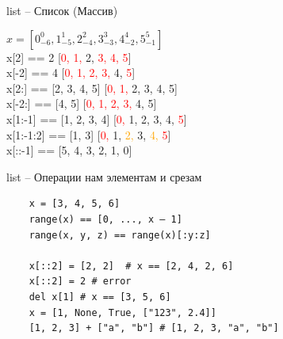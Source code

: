 \documentclass{article}
\begin{document}
\begin{center} list – Список (Массив) \end{center}
{
\Huge
\begin{flushleft}
$x = [0_{-6}^{0}, 1_{-5}^{1}, 2_{-4}^{2}, 3_{-3}^{3}, 4_{-2}^{4}, 5_{-1}^{5}]$ \\
\vspace{0.5cm}
x[2] == 2 \hspace{2cm}[\textcolor{red}{0, 1,} 2, \textcolor{red}{3, 4, 5}] \\
\vspace{0.5cm}
x[-2] == 4 \hspace{2cm}[\textcolor{red}{0, 1, 2, 3,} 4, \textcolor{red}{5}] \\
\vspace{0.5cm}
x[2:] == [2, 3, 4, 5] \hspace{2cm}[\textcolor{red}{0, 1, }2, 3, 4, 5] \\
\vspace{0.5cm}
x[-2:] == [4, 5] \hspace{2cm}[\textcolor{red}{0, 1, 2, 3,} 4, 5] \\
\vspace{0.5cm}
x[1:-1] == [1, 2, 3, 4] \hspace{2cm}[\textcolor{red}{0,} 1, 2, 3, 4, \textcolor{red}{5}] \\
\vspace{0.5cm}
x[1:-1:2] == [1, 3] \hspace{2cm}[\textcolor{red}{0,} 1, \textcolor{orange}{2,} 3, \textcolor{orange}{4,} \textcolor{red}{5}] \\
\vspace{0.5cm}
x[::-1] == [5, 4, 3, 2, 1, 0] \\
\end{flushleft}
}
\newpage

\begin{center} list – Операции нам элементам и срезам \end{center}
\vspace{15pt}
\begin{lstlisting}
	x = [3, 4, 5, 6]
	range(x) == [0, ..., x – 1]
	range(x, y, z) == range(x)[:y:z]

	x[::2] = [2, 2]  # x == [2, 4, 2, 6]
	x[::2] = 2 # error
	del x[1] # x == [3, 5, 6]
	x = [1, None, True, ["123", 2.4]]
	[1, 2, 3] + ["a", "b"] # [1, 2, 3, "a", "b"]
\end{lstlisting}
\newpage
\end{document}
